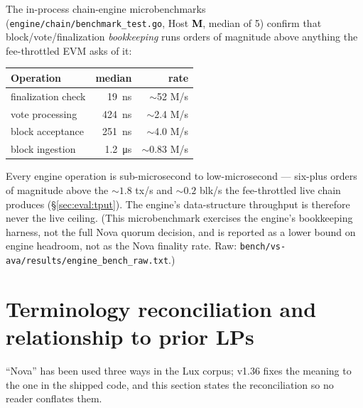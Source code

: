 \documentclass[11pt,a4paper]{article}
\newcommand{\Mnow}{\textbf{\textcolor{black}{M}}}   %
\begin{document}
The in-process chain-engine microbenchmarks (\texttt{engine/chain/benchmark\_test.go}, Host
\Mnow, median of 5) confirm that block/vote/finalization \emph{bookkeeping} runs orders of
magnitude above anything the fee-throttled EVM asks of it:

\begin{center}
\begin{tabular}{@{}l r r@{}}
\toprule
\textbf{Operation} & \textbf{median} & \textbf{rate} \\
\midrule
finalization check     & \SI{19}{ns}   & \(\sim\)\num{52} M/s \\
vote processing        & \SI{424}{ns}  & \(\sim\)\num{2.4} M/s \\
block acceptance       & \SI{251}{ns}  & \(\sim\)\num{4.0} M/s \\
block ingestion        & \SI{1.2}{\micro s} & \(\sim\)\num{0.83} M/s \\
\bottomrule
\end{tabular}
\end{center}

\noindent Every engine operation is sub-microsecond to low-microsecond --- six-plus orders of
magnitude above the \(\sim\!\num{1.8}\) tx/s and \(\sim\!\num{0.2}\) blk/s the fee-throttled
live chain produces (\S\ref{sec:eval:tput}). The engine's data-structure throughput is
therefore never the live ceiling. (This microbenchmark exercises the engine's bookkeeping
harness, not the full Nova quorum decision, and is reported as a lower bound on engine
headroom, not as the Nova finality rate. Raw:
\texttt{bench/vs-ava/results/engine\_bench\_raw.txt}.)

\section{Terminology reconciliation and relationship to prior LPs}
\label{sec:reconcile}

``Nova'' has been used three ways in the Lux corpus; v1.36 fixes the meaning to the one in the
shipped code, and this section states the reconciliation so no reader conflates them.
\end{document}
